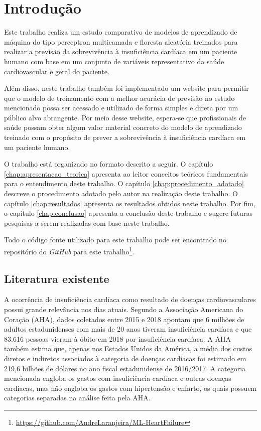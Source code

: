 \chapter{Introdução} \label{chap:introducao}

Este trabalho realiza um estudo comparativo de modelos de aprendizado de máquina do tipo perceptron multicamada e floresta aleatória treinados para realizar a previsão da sobrevivência à insuficiência cardíaca em um paciente humano com base em um conjunto de variáveis representativo da saúde cardiovascular e geral do paciente.

Além disso, neste trabalho também foi implementado um website para permitir que o modelo de treinamento com a melhor acurácia de previsão no estudo mencionado possa ser acessado e utilizado de forma simples e direta por um público alvo abrangente. Por meio desse website, espera-se que profissionais de saúde possam obter algum valor material concreto do modelo de aprendizado treinado com o propósito de prever a sobrevivência à insuficiência cardíaca em um paciente humano.

O trabalho está organizado no formato descrito a seguir. O capítulo \ref{chap:apresentacao_teorica} apresenta ao leitor conceitos teóricos fundamentais para o entendimento deste trabalho. O capítulo \ref{chap:procedimento_adotado} descreve o procedimento adotado pelo autor na realização deste trabalho. O capítulo \ref{chap:resultados} apresenta os resultados obtidos neste trabalho. Por fim, o capítulo \ref{chap:conclusao} apresenta a conclusão deste trabalho e sugere futuras pesquisas a serem realizadas com base neste trabalho.

Todo o código fonte utilizado para este trabalho pode ser encontrado no repositório do \textit{GitHub} para este trabalho\footnote{\url{https://github.com/AndreLaranjeira/ML-HeartFailure}}.

\section{Literatura existente}

A ocorrência de insuficiência cardíaca como resultado de doenças cardiovasculares possui grande relevância nos dias atuais. Segundo a Associação Americana do Coração (AHA), dados coletados entre 2015 e 2018 apontam que 6 milhões de adultos estadunidenses com mais de 20 anos tiveram insuficiência cardíaca\cite[p.8]{heart_disease2021} e que 83.616 pessoas vieram à óbito em 2018 por insuficiência cardíaca\cite[p.485]{heart_disease2021}. A AHA também estima que, apenas nos Estados Unidos da América, a média dos custos diretos e indiretos associados à categoria de doenças cardíacas foi estimado em 219,6 bilhões de dólares no ano fiscal estadunidense de 2016/2017\cite[p.481]{heart_disease2021}. A categoria mencionada engloba os gastos com insuficiência cardíaca e outras doenças cardíacas, mas não engloba os gastos com hipertensão e enfarto, os quais possuem categorias separadas na análise feita pela AHA.

